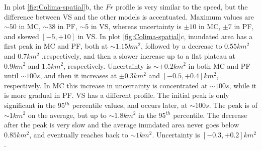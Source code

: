 \documentclass{article}
\begin{document}
In plot \ref{fig:Colima-spatial}b, the $Fr$ profile is very similar to the speed, but the difference between VS and the other models is accentuated. Maximum values are $\sim 50$ in MC, $\sim 38$ in PF, $\sim 5$ in VS, whereas uncertainty is $\pm 10$ in MC, $\pm 7$ in PF, and skewed $[-5, +10]$ in VS. In plot \ref{fig:Colima-spatial}c, inundated area has a first peak in MC and PF, both at $\sim 1.15 km^2$, followed by a decrease to $0.55 km^2$ and $0.7 km^2$ ,respectively, and then a slower increase up to a flat plateau at $0.9 km^2$ and $1.5 km^2$, respectively. Uncertainty is $\sim \pm 0.2 km^2$ in both MC and PF until $\sim 100 s$, and then it increases at $\pm 0.3 km^2$ and $[-0.5, +0.4] km^2$, respectively. In MC this increase in uncertainty is concentrated at $\sim 100 s$, while it is more gradual in PF. VS has a different profile. The initial peak is only significant in the 95$^{th}$ percentile values, and occurs later, at $\sim 100 s$. The peak is of $\sim 1 km^2$ on the average, but up to $\sim 1.8 km^2$ in the 95$^{th}$ percentile. The decrease after the peak is very slow and the average inundated area never goes below $0.85 km^2$, and eventually reaches back to $\sim 1 km^2$. Uncertainty is $[-0.3, +0.2] km^2$.
\end{document}
